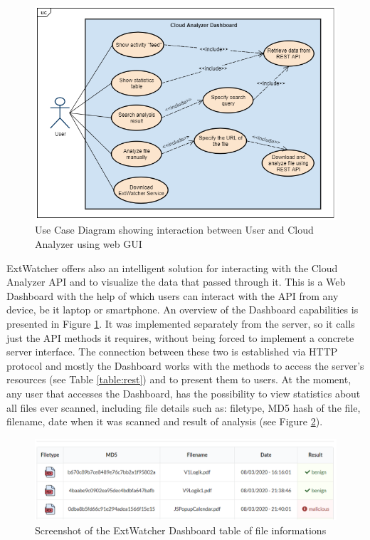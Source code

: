 \begin{figure}[H]
	\centerline{\includegraphics[scale=0.7]{figures/usecaseGUI.png}}  
	\caption{Use Case Diagram showing interaction between User and Cloud Analyzer using web GUI}
	\label{usecase}
\end{figure}

ExtWatcher offers also an intelligent solution for interacting with the Cloud Analyzer API and to visualize the data that passed through it. This is a Web Dashboard with the help of which users can interact with the API from any device, be it laptop or smartphone. An overview of the Dashboard capabilities is presented in Figure \ref{usecase}. It was implemented separately from the server, so it calls just the API methods it requires, without being forced to implement a concrete server interface. The connection between these two is established via HTTP protocol and mostly the Dashboard works with the  methods to access the server's resources (see Table \ref{table:rest}) and to present them to users. At the moment, any user that accesses the Dashboard, has the possibility to view statistics about all files ever scanned, including file details such as: filetype, MD5 hash of the file, filename, date when it was scanned and result of analysis (see Figure \ref{screenshot:infotable}). 

\begin{figure}[H]
	\centerline{\includegraphics[scale=0.6]{figures/infotable.png}}  
	\caption{Screenshot of the ExtWatcher Dashboard table of file informations}
	\label{screenshot:infotable}
\end{figure}

